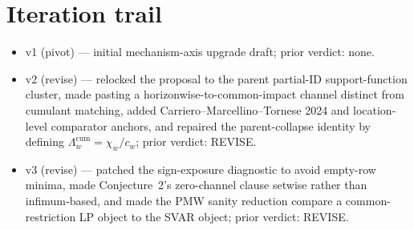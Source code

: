 \documentclass[11pt]{article}
\theoremstyle{definition}
\theoremstyle{plain}
\theoremstyle{remark}
\begin{document}
\section{Iteration trail}
\begin{itemize}[leftmargin=*]
\item v1 (pivot) --- initial mechanism-axis upgrade draft; prior verdict: none.
\item v2 (revise) --- relocked the proposal to the parent partial-ID support-function cluster, made pasting a horizonwise-to-common-impact channel distinct from cumulant matching, added Carriero--Marcellino--Tornese 2024 and location-level comparator anchors, and repaired the parent-collapse identity by defining \(\Lambda_w^{\mathrm{cum}}=\chi_w/c_w\); prior verdict: REVISE.
\item v3 (revise) --- patched the sign-exposure diagnostic to avoid empty-row minima, made Conjecture~2's zero-channel clause setwise rather than infimum-based, and made the PMW sanity reduction compare a common-restriction LP object to the SVAR object; prior verdict: REVISE.
\end{itemize}
\end{document}
